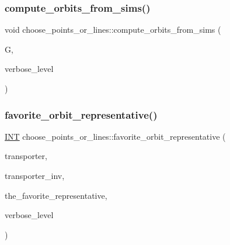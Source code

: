 \mbox{\label{classchoose__points__or__lines_a4fcac2dadf459d7c75187a00a4bd64aa}} 
\subsubsection{\texorpdfstring{compute\+\_\+orbits\+\_\+from\+\_\+sims()}{compute\_orbits\_from\_sims()}}
{\footnotesize\ttfamily void choose\+\_\+points\+\_\+or\+\_\+lines\+::compute\+\_\+orbits\+\_\+from\+\_\+sims (\begin{DoxyParamCaption}\item[{\mbox{\hyperlink{classsims}{sims}} $\ast$}]{G,  }\item[{\mbox{\hyperlink{galois_8h_a09fddde158a3a20bd2dcadb609de11dc}{I\+NT}}}]{verbose\+\_\+level }\end{DoxyParamCaption})}

\mbox{\label{classchoose__points__or__lines_ae2f603d9869c63a6ede08afc8e2da234}} 
\subsubsection{\texorpdfstring{favorite\+\_\+orbit\+\_\+representative()}{favorite\_orbit\_representative()}}
{\footnotesize\ttfamily \mbox{\hyperlink{galois_8h_a09fddde158a3a20bd2dcadb609de11dc}{I\+NT}} choose\+\_\+points\+\_\+or\+\_\+lines\+::favorite\+\_\+orbit\+\_\+representative (\begin{DoxyParamCaption}\item[{\mbox{\hyperlink{galois_8h_a09fddde158a3a20bd2dcadb609de11dc}{I\+NT}} $\ast$}]{transporter,  }\item[{\mbox{\hyperlink{galois_8h_a09fddde158a3a20bd2dcadb609de11dc}{I\+NT}} $\ast$}]{transporter\+\_\+inv,  }\item[{\mbox{\hyperlink{galois_8h_a09fddde158a3a20bd2dcadb609de11dc}{I\+NT}} $\ast$}]{the\+\_\+favorite\+\_\+representative,  }\item[{\mbox{\hyperlink{galois_8h_a09fddde158a3a20bd2dcadb609de11dc}{I\+NT}}}]{verbose\+\_\+level }\end{DoxyParamCaption})}

